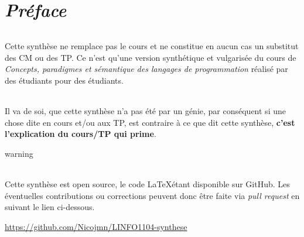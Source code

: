 \chapter*{\textbf{\textit{Préface}}}
    
    \subparagraph{}Cette synthèse ne remplace pas le cours et ne constitue en aucun cas un substitut des CM ou des TP. 
    Ce n'est qu'une version synthétique et vulgarisée du cours de \textit{Concepts, paradigmes et sémantique des 
    langages de programmation} réalisé par des étudiants pour des étudiants.

    \subparagraph{}Il va de soi, que cette synthèse n'a pas été par un génie, par conséquent si une chose dite en cours
    et/ou aux TP, est contraire à ce que dit cette synthèse, \textbf{c’est l’explication du cours/TP qui prime}.

    \vfill
    \begin{tbox}{warning}
        \subparagraph{}Cette synthèse est open source, le code \LaTeX\;étant disponible sur GitHub. Les éventuelles
        contributions ou corrections peuvent donc être faite via \textit{pull request} en suivant le lien ci-dessous.
        \tcblower
        \begin{center}
            \href{https://github.com/Nicojmn/LINFO1104-synthese}
            {https://github.com/Nicojmn/LINFO1104-synthese}
        \end{center}
    \end{tbox}
    \vfill